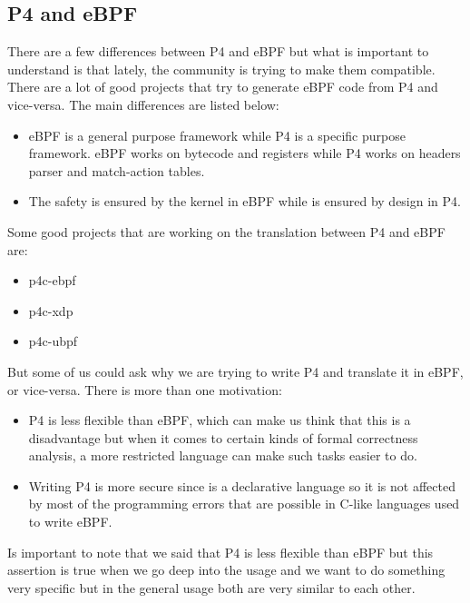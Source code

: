 \documentclass[../sn.tex]{subfiles}
\begin{document}
\subsection{P4 and eBPF}
There are a few differences between P4 and eBPF but what is important to understand is that lately, the community is trying to make them compatible.
There are a lot of good projects that try to generate eBPF code from P4 and vice-versa.
The main differences are listed below:
\begin{itemize}
  \item eBPF is a general purpose framework while P4 is a specific purpose framework. eBPF works on bytecode and registers while P4 works on headers parser and match-action tables.
  \item The safety is ensured by the kernel in eBPF while is ensured by design in P4.
\end{itemize}
Some good projects that are working on the translation between P4 and eBPF are:
\begin{itemize}
  \item p4c-ebpf
  \item p4c-xdp
  \item p4c-ubpf
\end{itemize}
But some of us could ask why we are trying to write P4 and translate it in eBPF, or vice-versa. There is more than one motivation:
\begin{itemize}
  \item P4 is less flexible than eBPF, which can make us think that this is a disadvantage but when it comes to certain kinds of formal correctness analysis, a more restricted language can make such tasks easier to do.
  \item Writing P4 is more secure since is a declarative language so it is not affected by most of the programming errors that are possible in C-like languages used to write eBPF.
\end{itemize}
Is important to note that we said that P4 is less flexible than eBPF but this assertion is true when we go deep into the usage and we want to do something very specific but in the general usage both are very similar to each other.
\clearpage
\end{document}
